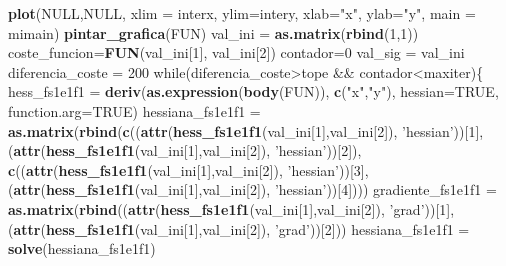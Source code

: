 \documentclass[]{article}
\newenvironment{Shaded}{\begin{snugshade}}{\end{snugshade}}
\newcommand{\KeywordTok}[1]{\textcolor[rgb]{0.13,0.29,0.53}{\textbf{{#1}}}}
\newcommand{\DataTypeTok}[1]{\textcolor[rgb]{0.13,0.29,0.53}{{#1}}}
\newcommand{\DecValTok}[1]{\textcolor[rgb]{0.00,0.00,0.81}{{#1}}}
\newcommand{\StringTok}[1]{\textcolor[rgb]{0.31,0.60,0.02}{{#1}}}
\newcommand{\OtherTok}[1]{\textcolor[rgb]{0.56,0.35,0.01}{{#1}}}
\newcommand{\NormalTok}[1]{{#1}}
\begin{document}
\begin{Shaded}
\begin{Highlighting}[]
  \KeywordTok{plot}\NormalTok{(}\OtherTok{NULL}\NormalTok{,}\OtherTok{NULL}\NormalTok{, }\DataTypeTok{xlim =} \NormalTok{interx, }\DataTypeTok{ylim=}\NormalTok{intery, }\DataTypeTok{xlab=}\StringTok{"x"}\NormalTok{, }\DataTypeTok{ylab=}\StringTok{"y"}\NormalTok{, }\DataTypeTok{main =} \NormalTok{mimain)}
  \KeywordTok{pintar_grafica}\NormalTok{(FUN)}
  \NormalTok{val_ini =}\StringTok{ }\KeywordTok{as.matrix}\NormalTok{(}\KeywordTok{rbind}\NormalTok{(}\DecValTok{1}\NormalTok{,}\DecValTok{1}\NormalTok{)) }
  \NormalTok{coste_funcion=}\KeywordTok{FUN}\NormalTok{(val_ini[}\DecValTok{1}\NormalTok{], val_ini[}\DecValTok{2}\NormalTok{])}
  \NormalTok{contador=}\DecValTok{0}
  \NormalTok{val_sig =}\StringTok{ }\NormalTok{val_ini}
  \NormalTok{diferencia_coste =}\StringTok{ }\DecValTok{200}
  \NormalTok{while(diferencia_coste>tope &&}\StringTok{ }\NormalTok{contador<maxiter)\{}
    \NormalTok{hess_fs1e1f1 =}\StringTok{ }\KeywordTok{deriv}\NormalTok{(}\KeywordTok{as.expression}\NormalTok{(}\KeywordTok{body}\NormalTok{(FUN)), }\KeywordTok{c}\NormalTok{(}\StringTok{"x"}\NormalTok{,}\StringTok{"y"}\NormalTok{), }\DataTypeTok{hessian=}\OtherTok{TRUE}\NormalTok{, }\DataTypeTok{function.arg=}\OtherTok{TRUE}\NormalTok{)}
    \NormalTok{hessiana_fs1e1f1 =}\StringTok{ }\KeywordTok{as.matrix}\NormalTok{(}\KeywordTok{rbind}\NormalTok{(}\KeywordTok{c}\NormalTok{((}\KeywordTok{attr}\NormalTok{(}\KeywordTok{hess_fs1e1f1}\NormalTok{(val_ini[}\DecValTok{1}\NormalTok{],val_ini[}\DecValTok{2}\NormalTok{]), }\StringTok{'hessian'}\NormalTok{))[}\DecValTok{1}\NormalTok{],}
                                         \NormalTok{(}\KeywordTok{attr}\NormalTok{(}\KeywordTok{hess_fs1e1f1}\NormalTok{(val_ini[}\DecValTok{1}\NormalTok{],val_ini[}\DecValTok{2}\NormalTok{]), }\StringTok{'hessian'}\NormalTok{))[}\DecValTok{2}\NormalTok{]),}
                                       \KeywordTok{c}\NormalTok{((}\KeywordTok{attr}\NormalTok{(}\KeywordTok{hess_fs1e1f1}\NormalTok{(val_ini[}\DecValTok{1}\NormalTok{],val_ini[}\DecValTok{2}\NormalTok{]), }\StringTok{'hessian'}\NormalTok{))[}\DecValTok{3}\NormalTok{],}
                                         \NormalTok{(}\KeywordTok{attr}\NormalTok{(}\KeywordTok{hess_fs1e1f1}\NormalTok{(val_ini[}\DecValTok{1}\NormalTok{],val_ini[}\DecValTok{2}\NormalTok{]), }\StringTok{'hessian'}\NormalTok{))[}\DecValTok{4}\NormalTok{])))}
    \NormalTok{gradiente_fs1e1f1 =}\StringTok{ }\KeywordTok{as.matrix}\NormalTok{(}\KeywordTok{rbind}\NormalTok{((}\KeywordTok{attr}\NormalTok{(}\KeywordTok{hess_fs1e1f1}\NormalTok{(val_ini[}\DecValTok{1}\NormalTok{],val_ini[}\DecValTok{2}\NormalTok{]), }\StringTok{'grad'}\NormalTok{))[}\DecValTok{1}\NormalTok{],}
                                        \NormalTok{(}\KeywordTok{attr}\NormalTok{(}\KeywordTok{hess_fs1e1f1}\NormalTok{(val_ini[}\DecValTok{1}\NormalTok{],val_ini[}\DecValTok{2}\NormalTok{]), }\StringTok{'grad'}\NormalTok{))[}\DecValTok{2}\NormalTok{]))}
    \NormalTok{hessiana_fs1e1f1 =}\StringTok{ }\KeywordTok{solve}\NormalTok{(hessiana_fs1e1f1)}


\end{Highlighting}
\end{Shaded}
\end{document}
